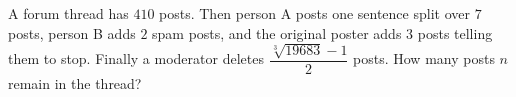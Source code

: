 A forum thread has $410$ posts. Then person A posts one sentence split over $7$ posts, person B adds $2$ spam posts, and the original poster adds $3$ posts telling them to stop. Finally a moderator deletes $\dfrac{\sqrt[3]{19683}-1}{2}$ posts. How many posts $n$ remain in the thread?
